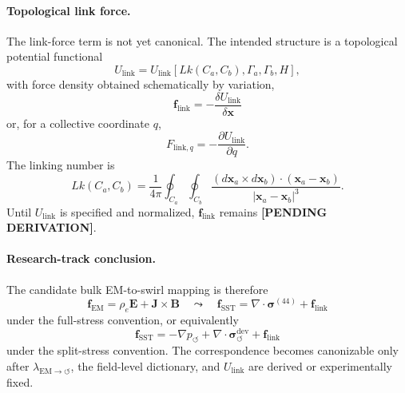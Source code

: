 \paragraph{Topological link force.}
The link-force term is not yet canonical.  The intended structure is a
topological potential functional
\[
U_{\mathrm{link}}
=
U_{\mathrm{link}}\!\left[
Lk(C_a,C_b),\Gamma_a,\Gamma_b,H
\right],
\]
with force density obtained schematically by variation,
\[
\boxed{
\mathbf f_{\mathrm{link}}
=
-\frac{\delta U_{\mathrm{link}}}{\delta \mathbf x}
}
\]
or, for a collective coordinate \(q\),
\[
\boxed{
F_{\mathrm{link},q}
=
-\frac{\partial U_{\mathrm{link}}}{\partial q}.
}
\]
The linking number is
\[
Lk(C_a,C_b)
=
\frac{1}{4\pi}
\oint_{C_a}\oint_{C_b}
\frac{
(d\mathbf x_a\times d\mathbf x_b)\cdot(\mathbf x_a-\mathbf x_b)
}{
|\mathbf x_a-\mathbf x_b|^3
}.
\]
Until \(U_{\mathrm{link}}\) is specified and normalized,
\(\mathbf f_{\mathrm{link}}\) remains
\textbf{[PENDING DERIVATION]}.

\paragraph{Research-track conclusion.}
The candidate bulk EM-to-swirl mapping is therefore
\[
\boxed{
\mathbf f_{\mathrm{EM}}
=
\rho_e\mathbf E+\mathbf J\times\mathbf B
\quad\leadsto\quad
\mathbf f_{\mathrm{SST}}
=
\nabla\cdot\boldsymbol{\sigma}^{(44)}
+
\mathbf f_{\mathrm{link}}
}
\]
under the full-stress convention, or equivalently
\[
\boxed{
\mathbf f_{\mathrm{SST}}
=
-\nabla p_{\circlearrowleft}
+
\nabla\cdot\boldsymbol{\sigma}^{\mathrm{dev}}_{\circlearrowleft}
+
\mathbf f_{\mathrm{link}}
}
\]
under the split-stress convention.  The correspondence becomes canonizable
only after
\(\lambda_{\mathrm{EM}\to\circlearrowleft}\),
the field-level dictionary, and
\(U_{\mathrm{link}}\)
are derived or experimentally fixed.
